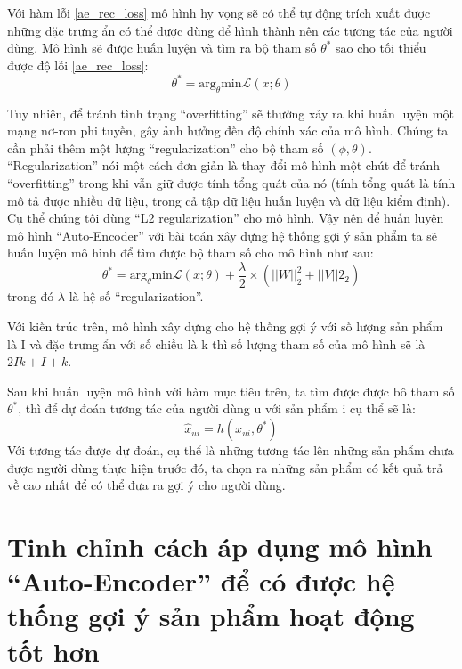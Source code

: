     Với hàm lỗi \ref{ae_rec_loss} mô hình hy vọng sẽ có thể tự động trích xuất được những đặc trưng ẩn có thể được dùng để hình thành nên các tương tác của người dùng.
    Mô hình sẽ được huấn luyện và tìm ra bộ tham số $\theta^*$ sao cho tối thiểu được độ lỗi \ref{ae_rec_loss}: 
    \begin{equation}
        \theta^* = \text{arg}_\theta \text{min}  \mathcal{L}(x;\theta)
    \end{equation}    
    

    Tuy nhiên, để tránh tình trạng ``overfitting'' sẽ thường xảy ra khi huấn luyện một mạng nơ-ron phi tuyến, gây ảnh hưởng đến độ chính xác của mô hình. 
    Chúng ta cần phải thêm một lượng ``regularization'' cho bộ tham số $(\phi,\theta)$.
    ``Regularization'' nói một cách đơn giản là thay đổi mô hình một chút để tránh ``overfitting'' trong khi vẫn giữ được tính tổng quát của nó (tính tổng quát là tính mô tả được nhiều dữ liệu, trong cả tập dữ liệu huấn luyện và dữ liệu kiểm định).
    Cụ thể chúng tôi dùng ``L2 regularization'' cho mô hình.
    Vậy nên để huấn luyện mô hình ``Auto-Encoder'' với bài toán xây dựng hệ thống gợi ý sản phẩm ta sẽ huấn luyện mô hình để tìm được bộ tham số cho mô hình  như sau:
    \begin{equation}
        \label{ae_rec_obj}
        \theta^* = \text{arg}_\theta \text{min}  \mathcal{L}(x;\theta)  + \frac \lambda 2 \times (||W||^2_2 + ||V||2_2)
    \end{equation}
    trong đó $\lambda$ là hệ số ``regularization''.

    Với kiến trúc trên, mô hình xây dựng cho hệ thống gợi ý với số lượng sản phẩm là I và đặc trưng ẩn với số chiều là k thì số lượng tham số của mô hình sẽ là $2Ik + I + k$.
    
    Sau khi huấn luyện mô hình với hàm mục tiêu trên, ta tìm được được bô tham số $\theta^*$, thì để dự đoán tương tác của người dùng u với sản phẩm i cụ thể sẽ là: 
    $$\widehat{x}_{ui} = h(x_{ui},\theta^*)$$
    Với tương tác được dự đoán, cụ thể là những tương tác lên những sản phẩm chưa được người dùng thực hiện trước đó, ta chọn ra những sản phẩm có kết quả trả về cao nhất để có thể đưa ra gợi ý cho người dùng. 
    

\section{Tinh chỉnh cách áp dụng mô hình ``Auto-Encoder'' để có được hệ thống gợi ý sản phẩm hoạt động tốt hơn}


